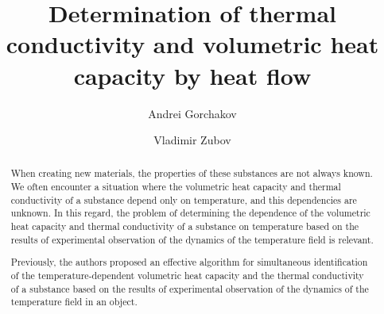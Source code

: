 \begin{englishtitle} %
\title{Determination of thermal conductivity and volumetric heat capacity by heat flow}
\author{Andrei Gorchakov  \and  Vladimir Zubov
}

\maketitle

\begin{abstract}
When creating new materials, the properties of these substances are not always known. We often encounter a situation where the volumetric heat capacity and thermal conductivity of a substance depend only on temperature, and this dependencies are unknown. In this regard, the problem of determining the dependence of the volumetric heat capacity and thermal conductivity of a substance on temperature based on the results of experimental observation of the dynamics of the temperature field is relevant.

Previously, the authors proposed an effective algorithm for simultaneous identification of the temperature-dependent volumetric heat capacity and the thermal conductivity of a substance based on the results of experimental observation of the dynamics of the temperature field in an object.


\end{abstract}
\end{englishtitle}

